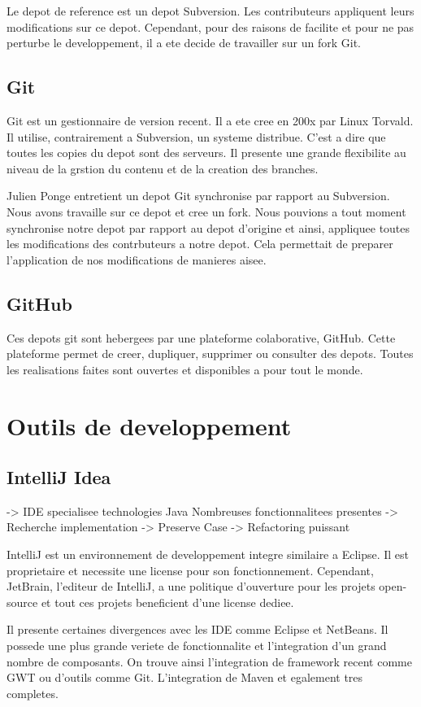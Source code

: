 Le depot de reference est un depot Subversion. Les contributeurs appliquent leurs modifications sur ce depot. Cependant, pour des raisons de facilite et pour ne pas perturbe le developpement, il a ete decide de travailler sur un fork Git.
\subsection{Git}
Git est un gestionnaire de version recent. Il a ete cree en 200x par Linux Torvald. Il utilise, contrairement a Subversion, un systeme distribue. C'est a dire que toutes les copies du depot sont des serveurs. Il presente une grande flexibilite au niveau de la grstion du contenu et de la creation des branches.

Julien Ponge entretient un depot Git synchronise par rapport au Subversion. Nous avons travaille sur ce depot et cree un fork. Nous pouvions a tout moment synchronise notre depot par rapport au depot d'origine et ainsi, appliquee toutes les modifications des contrbuteurs a notre depot. Cela permettait de preparer l'application de nos modifications de manieres aisee.
\subsection{GitHub}
Ces depots git sont hebergees par une plateforme colaborative, GitHub. Cette plateforme permet de creer, dupliquer, supprimer ou consulter des depots. Toutes les realisations faites sont ouvertes et disponibles a pour tout le monde.
\section{Outils de developpement}
\subsection{IntelliJ Idea}
-> IDE specialisee technologies Java
Nombreuses fonctionnalitees presentes
-> Recherche implementation 
-> Preserve Case
-> Refactoring puissant

IntelliJ est un environnement de developpement integre similaire a Eclipse. Il est proprietaire et necessite une license pour son fonctionnement. Cependant, JetBrain, l'editeur de IntelliJ, a une politique d'ouverture pour les projets open-source et tout ces projets beneficient d'une license dediee. 

Il presente certaines divergences avec les IDE comme Eclipse et NetBeans. Il possede une plus grande veriete de fonctionnalite et l'integration d'un grand nombre de composants. On trouve ainsi l'integration de framework recent comme GWT ou d'outils comme Git. L'integration de Maven et egalement tres completes. 

